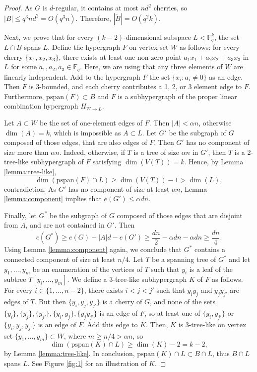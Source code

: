 \documentclass[11pt]{article}
\theoremstyle{plain}
\theoremstyle{definition}
\begin{document}
\begin{proof}
As $G$ is $d$-regular, it contains at most $nd^2$ cherries, so $|B|\leq q^3 n d^2=O(q^3 n)$. Therefore, $|\tilde{B}|=O(q^2 k)$.

Next, we prove that for every $(k-2)$-dimensional subspace $L<\mathbb{F}_q^k$, the set $L\cap B$ spans $L$. Define the hypergraph $F$ on vertex set $W$ as follows: for every cherry $\{x_1,x_2,x_3\}$, there exists at least one non-zero point $a_1x_1+a_2x_2+a_3x_3$ in $L$ for some $a_1,a_2,a_3\in\mathbb{F}_q$. Here, we are using that any three elements of $W$ are linearly independent. Add to the hypergraph $F$ the set  $\{x_i:a_i\neq 0\}$ as an edge. Then $F$ is $3$-bounded, and each cherry contributes a 1, 2, or 3 element edge to $F$. Furthermore, $\mbox{pspan}(F)\subset B$ and  $F$ is a subhypergraph of the proper linear combination hypergraph $H_{W\rightarrow L}$.

 Let $A\subset W$ be the set of one-element edges of $F$. Then $|A|< \alpha n$, otherwise $\dim(A)=k$, which is impossible as $A\subset L$. Let $G'$ be the subgraph of $G$ composed of those edges, that are also edges of $F$. Then $G'$ has no component of size more than $\alpha n$. Indeed, otherwise, if $T$ is a tree of size $\alpha n$ in $G'$, then $T$ is a $2$-tree-like subhypergraph of $F$ satisfying $\dim(V(T))=k$. Hence, by Lemma \ref{lemma:tree-like}, $$\dim(\mbox{pspan}(F)\cap L)\geq \dim(V(T))-1>\dim(L),$$ contradiction. As $G'$ has no component of size at least $\alpha n$, Lemma \ref{lemma:component} implies that $e(G')\leq \alpha d n$.

 Finally, let $G^*$ be the  subgraph of $G$ composed of those edges that are disjoint from $A$, and are not contained in $G'$. Then 
 $$e(G^*)\geq e(G)-|A|d-e(G')\geq \frac{dn}{2}-\alpha d n-\alpha d n\geq \frac{dn}{4}.$$
 Using Lemma \ref{lemma:component} again, we conclude that $G^*$ contains a connected component of size at least $n/4$. Let $T$ be a spanning tree of $G^*$ and let $y_1,\dots,y_m$ be an enumeration of the vertices of $T$ such that $y_i$ is a leaf of the subtree $T[y_i,\dots,y_m]$. We define a 3-tree-like subhypergraph $K$ of $F$ as follows. For every $i\in \{1,\dots,n-2\}$, there exists $i<j<j'$ such that $y_iy_j$ and $y_jy_{j'}$ are edges of $T$. But then $\{y_i,y_j,y_{j'}\}$ is a cherry of $G$, and none of the sets $\{y_i\}, \{y_j\},\{y_{j'}\}, \{y_i,y_j\}, \{y_jy_{j'}\}$ is an edge of $F$, so  at least one of $\{y_i,y_{j'}\}$ or $\{y_i,y_j,y_{j'}\}$ is an edge of $F$. Add this edge to $K$. 
 Then, $K$ is $3$-tree-like on vertex set $\{y_1,\dots,y_m\}\subset W$, where $m\geq n/4>\alpha n$, so $$\dim(\mbox{pspan}(K)\cap L)\geq \dim(K)-2=k-2,$$ by Lemma \ref{lemma:tree-like}. In conclusion, $\mbox{pspan}(K)\cap L\subset B\cap L$, thus $B\cap L$ spans $L$. See Figure \ref{fig:1} for an illustration of $K$.
 \end{proof}
\end{document}
